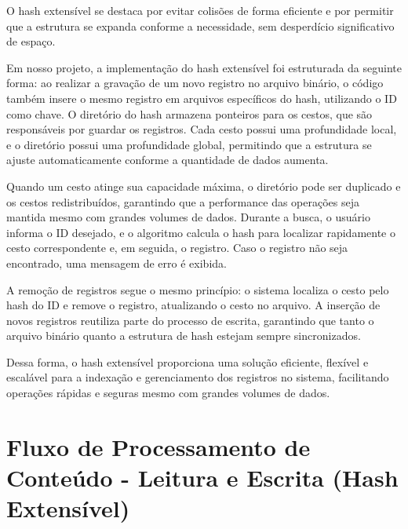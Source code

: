 \documentclass[12pt]{article}
\begin{document}
O hash extensível se destaca por evitar colisões de forma eficiente e por permitir que a estrutura se expanda conforme a necessidade, sem desperdício significativo de espaço.

Em nosso projeto, a implementação do hash extensível foi estruturada da seguinte forma: ao realizar a gravação de um novo registro no arquivo binário, o código também insere o mesmo registro em arquivos específicos do hash, utilizando o ID como chave. O diretório do hash armazena ponteiros para os cestos, que são responsáveis por guardar os registros. Cada cesto possui uma profundidade local, e o diretório possui uma profundidade global, permitindo que a estrutura se ajuste automaticamente conforme a quantidade de dados aumenta.

Quando um cesto atinge sua capacidade máxima, o diretório pode ser duplicado e os cestos redistribuídos, garantindo que a performance das operações seja mantida mesmo com grandes volumes de dados. Durante a busca, o usuário informa o ID desejado, e o algoritmo calcula o hash para localizar rapidamente o cesto correspondente e, em seguida, o registro. Caso o registro não seja encontrado, uma mensagem de erro é exibida.

A remoção de registros segue o mesmo princípio: o sistema localiza o cesto pelo hash do ID e remove o registro, atualizando o cesto no arquivo. A inserção de novos registros reutiliza parte do processo de escrita, garantindo que tanto o arquivo binário quanto a estrutura de hash estejam sempre sincronizados.

Dessa forma, o hash extensível proporciona uma solução eficiente, flexível e escalável para a indexação e gerenciamento dos registros no sistema, facilitando operações rápidas e seguras mesmo com grandes volumes de dados.

\section*{Fluxo de Processamento de Conteúdo - Leitura e Escrita (Hash Extensível)} 
\begin{center} 
\end{center}
\end{document}
